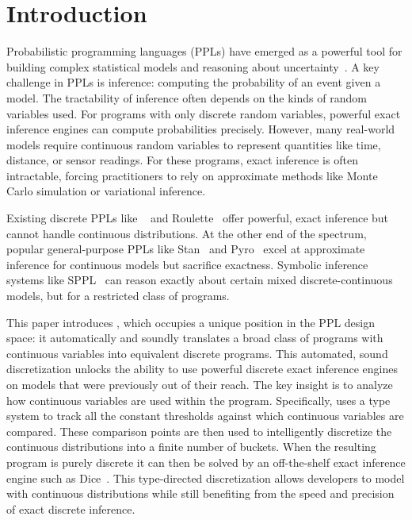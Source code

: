 \section{Introduction}\label{sec:intro}
Probabilistic programming languages (PPLs) have emerged as a powerful tool for building complex statistical models and reasoning about uncertainty~\cite{Moy2025Roulette,Holtzen2020Dice,DeRaedt2007ProbLog,Saad2021SPPL,Carpenter2017Stan,Salvatier2016PyMC3,Bingham2019Pyro,Dillon2017TFP,Tran2016Edward,Tolpin2016Anglican,Goodman2014WebPPL,Pfeffer2009Figaro,Minka2018InferNET,Ge2018Turing,CusumanoTowner2019Gen,Tehrani2020BeanMachine,Goodman2008Church}. A key challenge in PPLs is inference: computing the probability of an event given a model. The tractability of inference often depends on the kinds of random variables used. For programs with only discrete random variables, powerful exact inference engines can compute probabilities precisely. However, many real-world models require continuous random variables to represent quantities like time, distance, or sensor readings. For these programs, exact inference is often intractable, forcing practitioners to rely on approximate methods like Monte Carlo simulation or variational inference. 

Existing discrete PPLs like \Dice~\cite{Holtzen2020Dice} and Roulette~\cite{Moy2025Roulette} offer powerful, exact inference but cannot handle continuous distributions. At the other end of the spectrum, popular general-purpose PPLs like Stan~\cite{Carpenter2017Stan} and Pyro~\cite{Bingham2019Pyro} excel at approximate inference for continuous models but sacrifice exactness. Symbolic inference systems like SPPL~\cite{Saad2021SPPL} can reason exactly about certain mixed discrete-continuous models, but for a restricted class of programs.

This paper introduces \Slice{}, which occupies a unique position in the PPL design space: it automatically and soundly translates a broad class of programs with continuous variables into equivalent discrete programs. This automated, sound discretization unlocks the ability to use powerful discrete exact inference engines on models that were previously out of their reach. The key insight is to analyze how continuous variables are used within the program. Specifically, \Slice{} uses a type system to track all the constant thresholds against which continuous variables are compared. These comparison points are then used to intelligently discretize the continuous distributions into a finite number of buckets. When the resulting program is purely discrete it can then be solved by an off-the-shelf exact inference engine such as Dice~\cite{Holtzen2020Dice}. This type-directed discretization allows developers to model with continuous distributions while still benefiting from the speed and precision of exact discrete inference.

